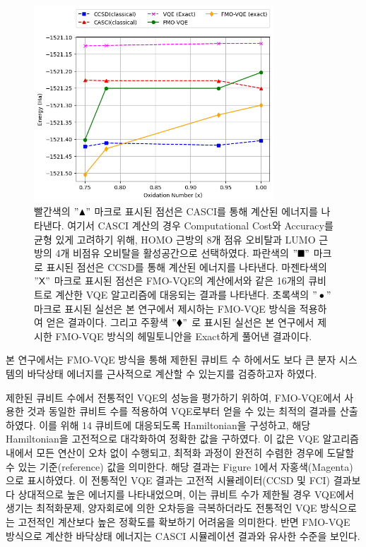 \documentclass[pdflatex,sn-mathphys-num]{sn-jnl}%
\theoremstyle{thmstyleone}%
\theoremstyle{thmstyletwo}%
\theoremstyle{thmstylethree}%
\begin{document}
\begin{figure}[htbp]
\centering
\includegraphics[width=0.8\textwidth]{fig/result2.png}
\caption{빨간색의 $"\blacktriangle"$ 마크로 표시된 점선은 CASCI를 통해 계산된 에너지를 나타낸다. 여기서 CASCI 계산의 경우 Computational Cost와 Accuracy를 균형 있게 고려하기 위해, HOMO 근방의 8개 점유 오비탈과 LUMO 근방의 4개 비점유 오비탈을 활성공간으로 선택하였다. 
파란색의 $"\blacksquare"$ 마크로 표시된 점선은 CCSD를 통해 계산된 에너지를 나타낸다. 
마젠타색의 $"\mathsf{X} "$ 마크로 표시된 점선은 FMO-VQE의 계산에서와 같은 16개의 큐비트로 계산한 VQE 알고리즘에 대응되는 결과를 나타낸다.
초록색의 $"\bullet  "$ 마크로 표시된 실선은 본 연구에서 제시하는 FMO-VQE 방식을 적용하여 얻은 결과이다. 
그리고 주황색 $"\blacklozenge "$ 로 표시된 실선은 본 연구에서 제시한 FMO-VQE 방식의 헤밀토니안을 Exact하게 풀어낸 결과이다.}\label{Fig.5}
\end{figure}

본 연구에서는 FMO-VQE 방식을 통해 제한된 큐비트 수 하에서도 보다 큰 분자 시스템의 바닥상태 에너지를 근사적으로 계산할 수 있는지를 검증하고자 하였다. 

제한된 큐비트 수에서 전통적인 VQE의 성능을 평가하기 위하여, FMO-VQE에서 사용한 것과 동일한 큐비트 수를 적용하여 VQE로부터 얻을 수 있는 최적의 결과를 산출하였다. 이를 위해 14 큐비트에 대응되도록 Hamiltonian을 구성하고, 해당 Hamiltonian을 고전적으로 대각화하여 정확한 값을 구하였다. 이 값은 VQE 알고리즘 내에서 모든 연산이 오차 없이 수행되고, 최적화 과정이 완전히 수렴한 경우에 도달할 수 있는 기준(reference) 값을 의미한다. 해당 결과는 Figure 1에서 자홍색(Magenta)으로 표시하였다. 이 전통적인 VQE 결과는 고전적 시뮬레이터(CCSD 및 FCI) 결과보다 상대적으로 높은 에너지를 나타내었으며, 이는 큐비트 수가 제한될 경우 VQE에서 생기는 최적화문제, 양자회로에 의한 오차등을 극복하더라도 전통적인 VQE 방식으로는 고전적인 계산보다 높은 정확도를 확보하기 어려움을 의미한다. 반면 FMO-VQE 방식으로 계산한 바닥상태 에너지는 CASCI 시뮬레이션 결과와 유사한 수준을 보인다. 
\end{document}
